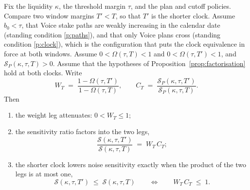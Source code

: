 \begin{theorem}
\label{thm:clock}
Fix the liquidity $\kappa$, the threshold margin $\tau$, and the plan and cutoff policies. Compare
two window margins $T' < T$, so that $T'$ is the shorter clock. Assume $b_0 < \tau$, that Voice
stake paths are weakly increasing in the calendar date (standing condition \ref{p:paths}), and
that only Voice plans cross (standing condition \ref{p:clock}), which is the configuration that
puts the clock equivalence in force at both windows. Assume $0 < \Omega(\tau,T) < 1$ and
$0 < \Omega(\tau,T') < 1$, and $\mathcal S_P(\kappa,\tau,T) > 0$. Assume that the hypotheses of
Proposition~\ref{prop:factorisation} hold at both clocks. Write
\begin{equation}
\label{eq:clock-legs}
W_T \;=\; \frac{1-\Omega(\tau,T')}{1-\Omega(\tau,T)},
\qquad
C_T \;=\; \frac{\mathcal S_P(\kappa,\tau,T')}{\mathcal S_P(\kappa,\tau,T)} .
\end{equation}
Then
\begin{enumerate}[label=(\roman*),leftmargin=2.4em,itemsep=3pt]
\item the weight leg attenuates: $0 < W_T \le 1$;
\item the sensitivity ratio factors into the two legs,
\begin{equation}
\label{eq:clock-ratio}
\frac{\mathcal S(\kappa,\tau,T')}{\mathcal S(\kappa,\tau,T)} \;=\; W_T\,C_T ;
\end{equation}
\item the shorter clock lowers noise sensitivity exactly when the product of the two legs is at
most one,
\begin{equation}
\label{eq:clock-iff}
\mathcal S(\kappa,\tau,T') \;\le\; \mathcal S(\kappa,\tau,T)
\qquad\Longleftrightarrow\qquad
W_T\,C_T \;\le\; 1 .
\end{equation}
\end{enumerate}
\end{theorem}

